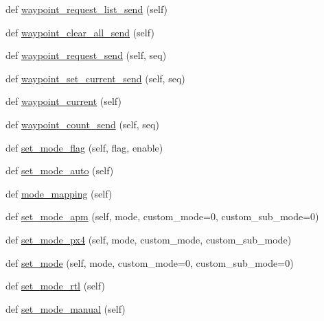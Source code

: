\begin{DoxyCompactItemize}
\item 
def \mbox{\hyperlink{classpymavlink_1_1mavutil_1_1mavfile_a49ca013cb65639e9c5a5a436cb0a7756}{waypoint\+\_\+request\+\_\+list\+\_\+send}} (self)
\item 
def \mbox{\hyperlink{classpymavlink_1_1mavutil_1_1mavfile_a3c9b70e6763649129f677074bd73e41a}{waypoint\+\_\+clear\+\_\+all\+\_\+send}} (self)
\item 
def \mbox{\hyperlink{classpymavlink_1_1mavutil_1_1mavfile_af14da05495c0927374c4356a527ad406}{waypoint\+\_\+request\+\_\+send}} (self, seq)
\item 
def \mbox{\hyperlink{classpymavlink_1_1mavutil_1_1mavfile_a5ada29335e23c51ef5902135668d07db}{waypoint\+\_\+set\+\_\+current\+\_\+send}} (self, seq)
\item 
def \mbox{\hyperlink{classpymavlink_1_1mavutil_1_1mavfile_aba2948f65c3186269715ffcb4b7ddce5}{waypoint\+\_\+current}} (self)
\item 
def \mbox{\hyperlink{classpymavlink_1_1mavutil_1_1mavfile_a2d15b0cae8037dda7803879aa11a3857}{waypoint\+\_\+count\+\_\+send}} (self, seq)
\item 
def \mbox{\hyperlink{classpymavlink_1_1mavutil_1_1mavfile_a67cb3ddd8971781b673bcd676596517c}{set\+\_\+mode\+\_\+flag}} (self, flag, enable)
\item 
def \mbox{\hyperlink{classpymavlink_1_1mavutil_1_1mavfile_a6433a671029040513eb170b3bfd1689a}{set\+\_\+mode\+\_\+auto}} (self)
\item 
def \mbox{\hyperlink{classpymavlink_1_1mavutil_1_1mavfile_a243064da4dc092d07af642404240613b}{mode\+\_\+mapping}} (self)
\item 
def \mbox{\hyperlink{classpymavlink_1_1mavutil_1_1mavfile_a05d005f98f3cbc966f8f00ef013475d5}{set\+\_\+mode\+\_\+apm}} (self, mode, custom\+\_\+mode=0, custom\+\_\+sub\+\_\+mode=0)
\item 
def \mbox{\hyperlink{classpymavlink_1_1mavutil_1_1mavfile_aa555cab4483c90f63af193958fa49204}{set\+\_\+mode\+\_\+px4}} (self, mode, custom\+\_\+mode, custom\+\_\+sub\+\_\+mode)
\item 
def \mbox{\hyperlink{classpymavlink_1_1mavutil_1_1mavfile_a284eb9b6577bb9d50a67f11ce892769f}{set\+\_\+mode}} (self, mode, custom\+\_\+mode=0, custom\+\_\+sub\+\_\+mode=0)
\item 
def \mbox{\hyperlink{classpymavlink_1_1mavutil_1_1mavfile_a6fda4c34e34cccf12e9a34e6103e1678}{set\+\_\+mode\+\_\+rtl}} (self)
\item 
def \mbox{\hyperlink{classpymavlink_1_1mavutil_1_1mavfile_aeff1ba57a638061a1eaca1286d9c5642}{set\+\_\+mode\+\_\+manual}} (self)

\end{DoxyCompactItemize}
